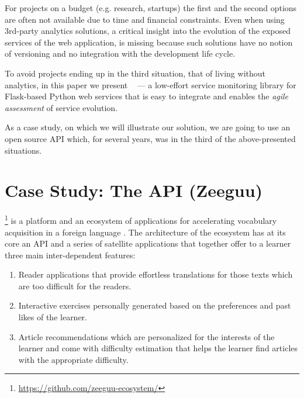 
For projects on a budget (e.g. research, startups) the first and the second options are often not available due to time and financial constraints. Even when using 3rd-party analytics solutions, a critical insight into the evolution of the exposed services of the web application, is missing because such solutions have no notion of versioning and no integration with the development life cycle.~\cite{papazoglou2011managing}

To avoid projects ending up in the third situation, that of living without analytics, in this paper we present \tool~ --- a low-effort service monitoring library for Flask-based Python web services that is easy to integrate and enables the {\em agile assessment} of service evolution. \cite{Nier12b}

As a case study, on which we will illustrate our solution, we are going to use an open source API which, for several years, was in the third of the above-presented situations.





\section{Case Study: The API (Zeeguu)}
\label{sec:case}


  \zee\footnote{\url{https://github.com/zeeguu-ecosystem/}} is a platform and an ecosystem of applications for accelerating vocabulary acquisition in a foreign language \cite{Lungu16}. 
%
  The architecture of the ecosystem has at its core an API and a series of satellite applications that together offer to a learner three main inter-dependent features:

  \begin{enumerate}

    \item Reader applications that provide effortless translations for those texts which are too difficult for the readers.

    \item Interactive exercises personally generated based on the preferences and past likes of the learner.

    \item Article recommendations which are personalized for the interests of the learner and come with difficulty estimation that helps the learner find articles with the appropriate difficulty.

  \end{enumerate}

